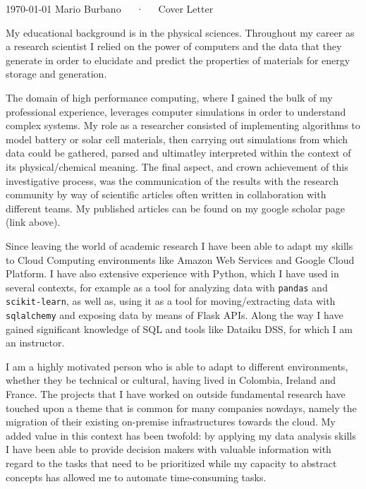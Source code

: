 \documentclass[11pt, a4paper]{awesome-cv}
\begin{document}
\makecvheader[R]

\makecvfooter
  {\today}
  {Mario Burbano~~~·~~~Cover Letter}
  {}

\makelettertitle

\begin{cvletter}


My educational background is in the physical sciences. Throughout my career as a research scientist I relied on the power of computers and the data that they generate in order to elucidate and predict the properties of materials for energy storage and generation.

The domain of high performance computing, where I gained the bulk of my professional experience, leverages computer simulations in order to understand complex systems. My role as a researcher consisted of implementing algorithms to model battery or solar cell materials, then carrying out simulations from which data could be gathered, parsed and ultimatley interpreted within the context of its physical/chemical meaning. The final aspect, and crown achievement of this investigative process, was the communication of the results with the research community by way of scientific articles often written in collaboration with different teams. My published articles can be found on my google scholar page (link above).

Since leaving the world of academic research I have been able to adapt my skills to Cloud Computing environments like Amazon Web Services and Google Cloud Platform. I have also extensive experience with Python, which I have used in several contexts, for example as a tool for analyzing data with \texttt{pandas} and \texttt{scikit-learn}, as well as, using it as a tool for moving/extracting data with \texttt{sqlalchemy} and exposing data by means of Flask APIs. Along the way I have gained significant knowledge of SQL and tools like Dataiku DSS, for which I am an instructor.

I am a highly motivated person who is able to adapt to different environments, whether they be technical or cultural, having lived in Colombia, Ireland and France. The projects that I have worked on outside fundamental research have touched upon a theme that is common for many companies nowdays, namely the migration of their existing on-premise infrastructures towards the cloud. My added value in this context has been twofold: by applying my data analysis skills I have been able to provide decision makers with valuable information with regard to the tasks that need to be prioritized while my capacity to abstract concepts has allowed me to automate time-consuming tasks.


\end{cvletter}
\end{document}
